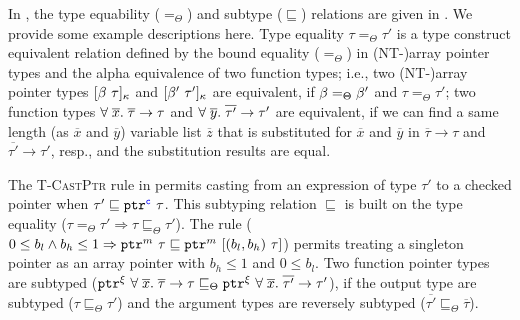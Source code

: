 %
In \lang, the type equability ($=_{\Theta}$) and subtype ($\sqsubseteq$) relations are given in .
We provide some example descriptions here.
Type equality $\tau=_{\Theta}\tau'$
is a type construct equivalent relation defined by the bound equality ($=_{\Theta}$) in (NT-)array pointer types
and the alpha equivalence of two function types;
i.e., two (NT-)array pointer types $\tallarrayb{\bvar}{\tau} $ and $ \tallarrayb{\bvar'}{\tau'}$ are equivalent, if 
$\bvar =_{\Theta} \bvar'$ and $\tau=_{\Theta}\tau'$; two function types 
$\tfun{\overline{x}}{\overline{\tau}}{\tau} $ and $ \tfun{\overline{y}}{\overline{\tau'}}{\tau'}$
are equivalent, if we can find a same length (as $\overline{x}$ and $\overline{y}$) variable list $\overline{z}$ that is substituted for $\overline{x}$ and $\overline{y}$ in $\overline{\tau} \to {\tau}$ and $\overline{\tau'} \to {\tau'}$, resp.,
and the substitution results are equal.

The \textsc{T-CastPtr} rule in 
permits casting from an expression of type $\tau'$ to a checked pointer when
$\tau' \sqsubseteq \tptr{\tau}{\cmode}$. This subtyping relation
$\sqsubseteq$ is built on the type equality ($\tau =_{\Theta} \tau'\Rightarrow\tau \sqsubseteq_{\Theta} \tau'$). 
The rule  ($0\le b_l \wedge b_h \le 1 \Rightarrow \tptr{\tau}{m}\sqsubseteq
\tarrayptr{b_l}{b_h}{\tau}{m}$) permits treating a singleton
pointer as an array pointer with $b_h\le 1$ and $0 \le b_l$.
Two function pointer types are subtyped ($\tptr{\tfun{\overline{x}}{\overline{\tau}}{\tau}}{\xi} \sqsubseteq_{\Theta} \tptr{\tfun{\overline{x}}{\overline{\tau'}}{\tau'}}{\xi}$), 
if the output type are subtyped ($\tau\sqsubseteq_{\Theta}\tau'$) and the argument types are reversely subtyped ($\overline{\tau'}\sqsubseteq_{\Theta}\overline{\tau}$).

